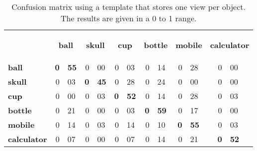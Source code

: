 \begin{table}[H]
\centering
\begin{tabular} {l r@{.}l r@{.}l r@{.}l r@{.}l r@{.}l r@{.}l }
\toprule
\addlinespace[3mm]
   \multicolumn{1}{c}{\begin{center}\textbf{Real} \mid \textbf{Predicted}\end{center}} &
   \multicolumn{2}{c}{\begin{flushright}\textbf{ball}\end{flushright}} &
   \multicolumn{2}{c}{\begin{flushright}\textbf{skull}\end{flushright}} &
   \multicolumn{2}{c}{\begin{flushright}\textbf{cup}\end{flushright}} &
   \multicolumn{2}{c}{\begin{flushright}\textbf{bottle}\end{flushright}} &
   \multicolumn{2}{c}{\begin{flushright}\textbf{mobile}\end{flushright}} &
   \multicolumn{2}{c}{\begin{flushright}\textbf{calculator}\end{flushright}} &\\

\addlinespace[-3mm]

\midrule
\textbf{ball}		&	\textbf{0}&\textbf{55}	&	0&00	&	0&03	&	0&14	&	0&28	&	0&00	\\
\textbf{skull}		&	0&03	&	\textbf{0}&\textbf{45}	&	0&28	&	0&24	&	0&00	&	0&00	\\
\textbf{cup}		&	0&00	&	0&03	&	\textbf{0}&\textbf{52}	&	0&14	&	0&28	&	0&03	\\
\textbf{bottle}		&	0&21	&	0&00	&	0&03	&	\textbf{0}&\textbf{59}	&	0&17	&	0&00	\\
\textbf{mobile}		&	0&14	&	0&03	&	0&14	&	0&10	&	\textbf{0}&\textbf{55}	&	0&03	\\
\textbf{calculator}	&	0&07	&	0&00	&	0&07	&	0&14	&	0&21	&	\textbf{0}&\textbf{52}	\\


\bottomrule
\end{tabular}
\caption[Confusion matrix - templates using 1 view]{Confusion matrix using a template that stores one view per object. The results are given in a 0 to 1 range. }
\label{1view_matrix}
\end{table}





